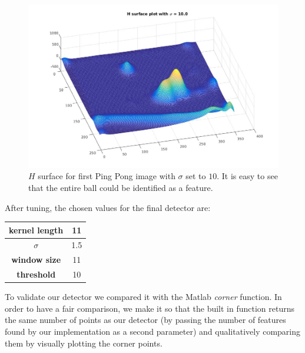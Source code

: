 \documentclass[11pt]{article}
\begin{document}
\begin{figure}[H] \centering
	\includegraphics[width=.8\textwidth]{imgs/surface_pingpong_s10.jpg}
	\caption{$H$ surface for first Ping Pong image with $\sigma$ set to $10$. It is
	easy to see that the entire ball could be identified as a feature.}
	\label{fig:surface_pingpong_s10}
\end{figure}

After tuning, the chosen values for the final detector are:

\begin{center}
	\begin{tabular}{| c | c |}
		\hline
		\textbf{kernel length} & 11   \\ \hline
		\textbf{$\sigma$}      & 1.5  \\ \hline
		\textbf{window size}   & 11   \\ \hline
		\textbf{threshold}     & 10   \\
		\hline
	\end{tabular}
\end{center}

To validate our detector we compared it with the Matlab \emph{corner} function. In
order to have a fair comparison, we make it so that the built in function
returns the same number of points as our detector (by passing the number of
features found by our implementation as a second parameter) and qualitatively
comparing them by visually plotting the corner points.
 
\end{document}
